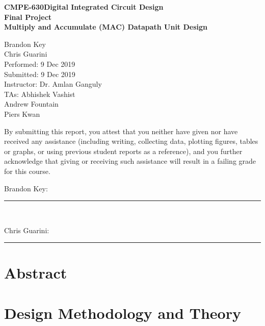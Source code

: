 \documentclass[11pt]{article}
\newcommand{\ClassNameS}{CMPE-630}
\newcommand{\ClassNameL}{Digital Integrated Circuit Design}
\newcommand{\ExerciseName}{Final Project}
\newcommand{\SubTitle}{Multiply and Accumulate (MAC) Datapath Unit Design}
\newcommand{\DueDate}{9 Dec 2019}
\begin{document}
\thispagestyle{empty}

%
%

\vspace*{2 cm}

\begin{center}
\bf{\ClassNameS \space \ClassNameL\\
    \ExerciseName\\
\vspace{0.25 cm}
\SubTitle
}
\end{center}

\vspace{4 cm}

\begin{flushright}
Brandon Key\\
Chris Guarini\\
Performed: 9 Dec 2019\\
Submitted: \DueDate\\
\vspace{0.5 cm}
Instructor: Dr. Amlan Ganguly\\
TAs: Abhishek Vashist\\
Andrew Fountain\\
Piers Kwan\\
\vspace{0.5 cm}
\end{flushright}

\vspace{2 cm}
\indent By submitting this report, you attest that you neither have given nor have received any assistance (including writing, collecting data, plotting figures, tables or graphs, or using previous student reports as a reference), and you further acknowledge that giving or receiving such assistance will result in a failing grade for this course.

\vspace{1 cm}

Brandon Key:   \rule{13cm}{.1pt}\\
\vspace{1 cm}

Chris Guarini:   \rule{13cm}{.1pt}

\newpage
\tableofcontents
\newpage

\section{Abstract}

	
	

\section{Design Methodology and Theory}
\end{document}
